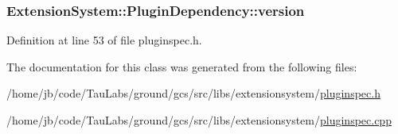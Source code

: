 \hypertarget{struct_extension_system_1_1_plugin_dependency_a2d00bf5564134af5cb2eeddf2074eee8}{
\subsubsection[{version}]{ {\bf \-Extension\-System\-::\-Plugin\-Dependency\-::version}}}\label{struct_extension_system_1_1_plugin_dependency_a2d00bf5564134af5cb2eeddf2074eee8}


\-Definition at line 53 of file pluginspec.\-h.



\-The documentation for this class was generated from the following files\-:\begin{DoxyCompactItemize}
\item 
/home/jb/code/\-Tau\-Labs/ground/gcs/src/libs/extensionsystem/\hyperlink{pluginspec_8h}{pluginspec.\-h}\item 
/home/jb/code/\-Tau\-Labs/ground/gcs/src/libs/extensionsystem/\hyperlink{pluginspec_8cpp}{pluginspec.\-cpp}\end{DoxyCompactItemize}
